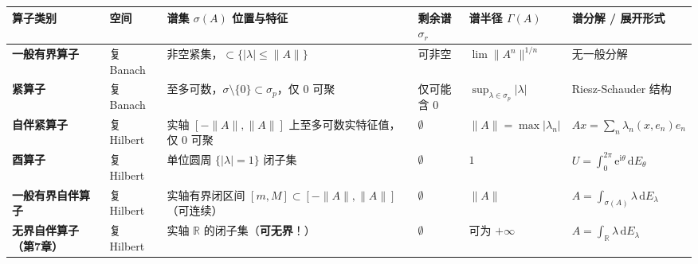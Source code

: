 \documentclass[11pt,a4paper]{article}
\newcounter{none}
\begin{document}
{\def\LTcaptype{none} %
{\small\renewcommand{\arraystretch}{1.38}\setlength{\tabcolsep}{5pt}
\begin{longtable}[]{@{}
  >{\raggedright\arraybackslash}p{}
  >{\centering\arraybackslash}p{}
  >{\raggedright\arraybackslash}p{}
  >{\centering\arraybackslash}p{}
  >{\centering\arraybackslash}p{}
  >{\raggedright\arraybackslash}p{}@{}}
\toprule\noalign{}
\rowcolor{AccentSoft}
\begin{minipage}[b]{\linewidth}\raggedright
算子类别
\end{minipage} & \begin{minipage}[b]{\linewidth}\centering
空间
\end{minipage} & \begin{minipage}[b]{\linewidth}\raggedright
谱集 \(\sigma(A)\) 位置与特征
\end{minipage} & \begin{minipage}[b]{\linewidth}\centering
剩余谱 \(\sigma_r\)
\end{minipage} & \begin{minipage}[b]{\linewidth}\centering
谱半径 \(\Gamma(A)\)
\end{minipage} & \begin{minipage}[b]{\linewidth}\raggedright
谱分解 / 展开形式
\end{minipage} \\
\midrule\noalign{}
\endhead
\bottomrule\noalign{}
\endlastfoot
\textbf{一般有界算子} & 复 Banach & 非空紧集，\(\subset\{\lvert\lambda\rvert\le\lVert A\rVert\}\) & 可非空 & \(\lim\lVert A^n\rVert^{1/n}\) & 无一般分解 \\
\textbf{紧算子} & 复 Banach & 至多可数，\(\sigma\setminus\{0\}\subset\sigma_p\)，仅 \(0\) 可聚 & 仅可能含 \(0\) & \(\sup_{\lambda\in\sigma_p}\lvert\lambda\rvert\) & Riesz-Schauder 结构 \\
\textbf{自伴紧算子} & 复 Hilbert & 实轴 \([-\lVert A\rVert, \lVert A\rVert]\) 上至多可数实特征值，仅 \(0\) 可聚 & \(\emptyset\) & \(\lVert A\rVert = \max\lvert\lambda_n\rvert\) & \(Ax = \sum_n \lambda_n(x,e_n)e_n\) \\
\textbf{酉算子} & 复 Hilbert & 单位圆周 \(\{\lvert\lambda\rvert = 1\}\) 闭子集 & \(\emptyset\) & \(1\) & \(U = \int_0^{2\pi}\mathrm{e}^{\mathrm{i}\theta}\,\mathrm{d}E_\theta\) \\
\textbf{一般有界自伴算子} & 复 Hilbert & 实轴有界闭区间 \([m, M]\subset[-\lVert A\rVert, \lVert A\rVert]\)（可连续） & \(\emptyset\) & \(\lVert A\rVert\) & \(A = \int_{\sigma(A)}\lambda\,\mathrm{d}E_\lambda\) \\
\textbf{无界自伴算子（第7章）} & 复 Hilbert & 实轴 \(\mathbb{R}\) 的闭子集（\textbf{可无界}！） & \(\emptyset\) & 可为 \(+\infty\) & \(A = \int_{\mathbb{R}}\lambda\,\mathrm{d}E_\lambda\) \\
\end{longtable}
}
}
\end{document}

